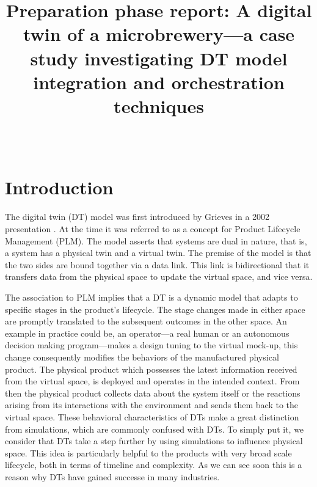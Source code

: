 \documentclass[journal,onecolumn]{IEEEtran} %
\begin{document}
\title{\LARGE Preparation phase report: A digital twin of a microbrewery---a case study investigating DT model integration and orchestration techniques}
\author{ \\}
\maketitle

\tableofcontents
\pagebreak

\section{Introduction}
The digital twin (DT) model was first introduced by Grieves in a 2002 presentation \cite{Grieves2019}. At the time it was referred to as a concept for Product Lifecycle Management (PLM). The model asserts that systems are dual in nature, that is, a system has a physical twin and a virtual twin. The premise of the model is that the two sides are bound together via a data link. This link is bidirectional that it transfers data from the physical space to update the virtual space, and vice versa. 

The association to PLM implies that a DT is a dynamic model that adapts to specific stages in the product's lifecycle. The stage changes made in either space are promptly translated to the subsequent outcomes in the other space. An example in practice could be, an operator---a real human or an autonomous decision making program---makes a design tuning to the virtual mock-up, this change consequently modifies the behaviors of the manufactured physical product. The physical product which possesses the latest information received from the virtual space, is deployed and operates in the intended context. From then the physical product collects data about the system itself or the reactions arising from its interactions with the environment and sends them back to the virtual space. These behavioral characteristics of DTs make a great distinction from simulations, which are commonly confused with DTs. To simply put it, we consider that DTs take a step further by using simulations to influence physical space. This idea is particularly helpful to the products with very broad scale lifecycle, both in terms of timeline and complexity. As we can see soon this is a reason why DTs have gained successe in many industries.
\end{document}
